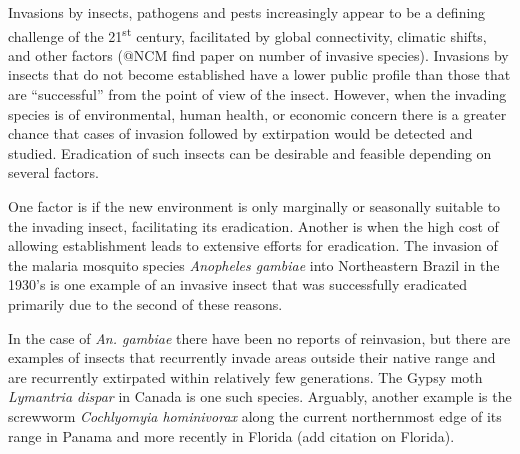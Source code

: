 \documentclass[10pt,a4paper,twocolumn]{article}
\begin{document}
Invasions by insects, pathogens and pests increasingly appear to be a 
defining challenge of the 21\textsuperscript{st} century,
facilitated by global connectivity, climatic shifts, and
other factors\cite{simberloff_impacts_2013}
(@NCM find paper on number of invasive species).
Invasions by insects that do not become established have a lower public profile
than those that are ``successful'' from the point of view of the insect.
However, when the invading species is of environmental, human health, or 
economic concern there is a greater chance that cases of invasion followed 
by extirpation would be detected 
and studied\cite{liebhold_population_2008}.
Eradication of such insects can be desirable and 
feasible\cite{myers_eradication_2000} depending on several factors.

One factor is if the new environment is only marginally or 
seasonally suitable to the invading insect, facilitating its eradication.
Another is when the high cost of allowing establishment leads
to extensive efforts for eradication.
The invasion of the malaria mosquito species \textit{Anopheles gambiae}
into Northeastern Brazil in the 1930's\cite{soper_emphanopheles_1943}
is one example of an invasive insect that was successfully eradicated 
primarily due to the second of these
reasons\cite{causey_ecology_1943,killeen_eradication_2002}.

In the case of \textit{An. gambiae} there have been no reports of
reinvasion, but there are examples of insects that
recurrently invade areas outside their native range and are recurrently
extirpated within relatively few generations.
The Gypsy moth \textit{Lymantria dispar} in Canada\cite{gray_hitchhikers_2010} 
is one such species.
Arguably, another example is 
the screwworm \textit{Cochlyomyia hominivorax} along 
the current northernmost edge of its range in 
Panama\cite{robinson_enabling_2009}
and more recently in Florida (add citation on Florida).
\end{document}
